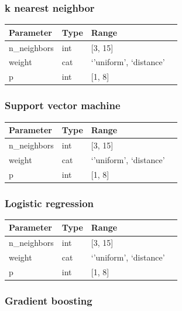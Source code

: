 \documentclass[a4paper,12pt,nottoc]{article}
\begin{document}
\subsubsection*{k nearest neighbor \cite{bib:knn}}

\begin{center}
\begin{tabular}{| l | l | l | l |}
\hline
Parameter & Type & Range \\
\hline
n\_neighbors & int & [3, 15] \\
weight & cat & `'uniform', `distance' \\
p & int & [1, 8] \\
\hline 
\end{tabular}
\end{center}

\subsubsection*{Support vector machine}

\begin{center}
\begin{tabular}{| l | l | l | l |}
\hline
Parameter & Type & Range \\
\hline
n\_neighbors & int & [3, 15] \\
weight & cat & `'uniform', `distance' \\
p & int & [1, 8] \\
\hline 
\end{tabular}
\end{center}

\subsubsection*{Logistic regression \cite{bib:knn}}

\begin{center}
\begin{tabular}{| l | l | l | l |}
\hline
Parameter & Type & Range \\
\hline
n\_neighbors & int & [3, 15] \\
weight & cat & `'uniform', `distance' \\
p & int & [1, 8] \\
\hline 
\end{tabular}
\end{center}

\subsubsection*{Gradient boosting \cite{bib:knn}}
\end{document}
